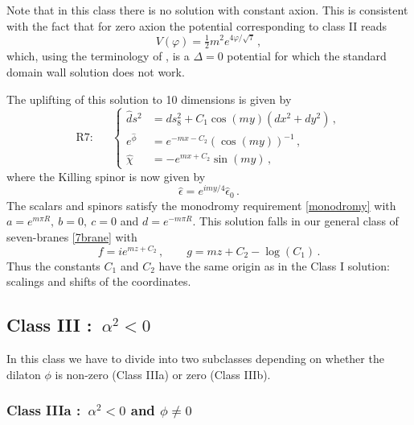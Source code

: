 \documentclass[12pt,a4paper]{article}
\begin{document}
Note that in this class there is no solution with constant axion. This is
consistent with the fact that for zero axion the potential
corresponding to class II reads
\begin{equation}
 V(\varphi) = \tfrac{1}{2}m^2 e^{4 \varphi / \sqrt{7}}\, ,
\end{equation}
which, using the terminology of \cite{Lu:1996hm,Lu:1995cs}, is a
$\Delta = 0$ potential for which the standard domain wall solution
does not work.

The uplifting of this solution to 10 dimensions is given by
\begin{equation}
  \text{R7:~~~~~}\left\{\begin{aligned}
  \hat{d}s^2 & = ds_8^2+C_1 \cos(my) \left(dx^2+dy^2
  \right)\,,\\
  e^{\hat\phi} & = e^{-m x-C_2} \left(\cos( m y) \right)^{-1}\,,\\
  \hat\chi & = - e^{m x+C_2} \sin(m y)\,,\end{aligned}\right.
\end{equation}
where the Killing spinor is now given by
\begin{equation}
\hat\epsilon=e^{i m y/4}\hat\epsilon_0\,.
\end{equation}
The scalars and spinors
satisfy the monodromy requirement \eqref{monodromy} with
$a=e^{m\pi R} ,\ b= 0 ,\ c=0 $ and $d= e^{-m\pi R}$.
This solution falls in our general class of seven-branes
\eqref{7brane} with
\begin{equation}
  f = i e^{m z+C_2} \,, \qquad
  g = m z +C_2 - \log(C_1) \,.
\end{equation}
Thus the constants $C_1$ and $C_2$ have the same origin as in the
Class I solution: scalings and shifts of the coordinates.


\subsection{Class III :\ $\alpha^2 <0$}

In this class we have to divide into two subclasses depending on whether the
dilaton $\phi$ is non-zero (Class IIIa) or zero (Class IIIb).

\subsubsection{Class IIIa :\ $\alpha^2 <0$ and $\phi \neq 0$}
\end{document}
